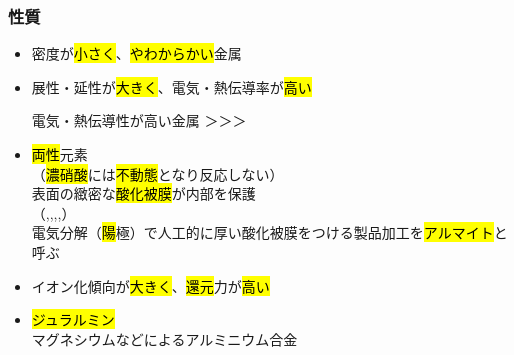 \subsubsection{性質}
\begin{itemize}
  \item 密度が\hl{小さく}、\hl{やわからかい}金属
  \item 展性・延性が\hl{大きく}、電気・熱伝導率が\hl{高い}
        \begin{itembox}[l]{電気・熱伝導性が高い金属}
          \hl{}＞\hl{}＞\hl{}＞\hl{}
        \end{itembox}
  \item \hl{両性}元素\\
        （\hl{濃硝酸}には\hl{不動態}となり反応しない）\\
        表面の緻密な\hl{酸化被膜}が内部を保護\\
        （\hl{},\hl{},\hl{},\hl{},\hl{}）\\
        電気分解（\hl{陽}極）で人工的に厚い酸化被膜をつける製品加工を\hl{アルマイト}と呼ぶ
  \item イオン化傾向が\hl{大きく}、\hl{還元}力が\hl{高い}
  \item \hl{ジュラルミン}\\
      マグネシウムなどによるアルミニウム合金
\end{itemize}
